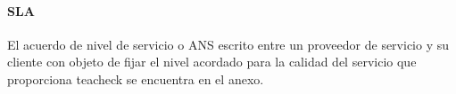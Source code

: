 \begin{itemize}
\paragraph{SLA}
El acuerdo de nivel de servicio o ANS escrito entre un proveedor de servicio y su cliente con objeto de fijar el nivel acordado para la calidad del servicio que proporciona teacheck se encuentra en el anexo.

\end{itemize}